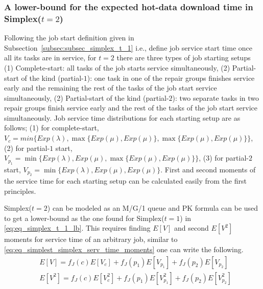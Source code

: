 \documentclass[sigconf,draft]{acmart}
\begin{document}
\subsubsection{A lower-bound for the expected hot-data download time in Simplex($t=2$)}
\label{subsec:subsec_lb_simplex_t_2}
Following the job start definition given in Subsection~\ref{subsec:subsec_simplex_t_1} i.e., define job service start time once all its tasks are in service, for $t=2$ there are three types of job starting setups (1) Complete-start: all tasks of the job starts service simultaneously, (2) Partial-start of the  kind (partial-$1$): one task in one of the repair groups finishes service early and the remaining the rest of the tasks of the job start service simultaneously, (2) Partial-start of the  kind (partial-$2$): two separate tasks in two repair groups finish service early and the rest of the tasks of the job start service simultaneously. Job service time distributions for each starting setup are as follows; (1) for complete-start, $V_c = min\{Exp(\lambda),\max\{Exp(\mu),Exp(\mu)\},\max\{Exp(\mu),Exp(\mu)\}\}$, (2) for partial-$1$ start, $V_{p_1} = \min\{Exp(\lambda),Exp(\mu),\max\{Exp(\mu),Exp(\mu)\}\}$, (3) for partial-$2$ start, $V_{p_2} = \min\{Exp(\lambda),Exp(\mu),Exp(\mu)\}$. First and second moments of the service time for each starting setup can be calculated easily from the first principles.

Simplex($t=2$) can be modeled as an M/G/1 queue and PK formula can be used to get a lower-bound as the one found for Simplex($t=1$) in \eqref{eq:eq_simplex_t_1_lb}. This requires finding $E[V]$ and second $E[V^2]$ moments for service time of an arbitrary job, similar to \eqref{eq:eq_simplest_simplex_serv_time_moments} one can write the following.
\begin{equation}
  \label{eq:eq_simplex_t_2_moments}
  \begin{split}
    & E[V] = f_J(c)E[V_c] + f_J(p_1)E[V_{p_1}] + f_J(p_2)E[V_{p_2}] \\
    & E[V^2] = f_J(c)E[V_c^2] + f_J(p_1)E[V_{p_1}^2] + f_J(p_2)E[V_{p_2}^2]
  \end{split}
\end{equation}
\end{document}
